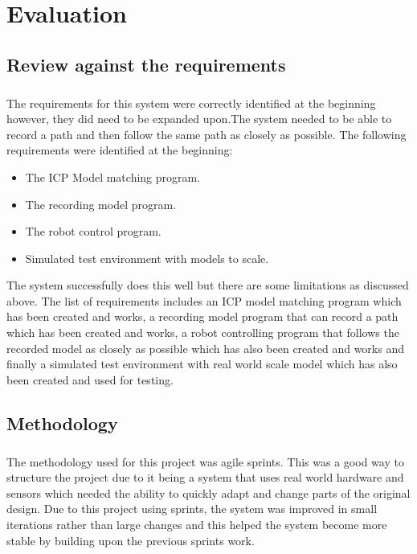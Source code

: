 \chapter{Evaluation}

\section{Review against the requirements}
\paragraph{}
The requirements for this system were correctly identified at the beginning however, they did need to be expanded upon.The system needed to be able to record a path and then follow the same path as closely as possible. The following requirements were identified at the beginning:
\begin{itemize}
  \item The ICP Model matching program.
  \item The recording model program.
  \item The robot control program.
  \item Simulated test environment with models to scale.
\end{itemize}
The system successfully does this well but there are some limitations as discussed above. The list of requirements includes an ICP model matching program which has been created and works, a recording model program that can record a path which has been created and works, a robot controlling program that follows the recorded model as closely as possible which has also been created and works and finally a simulated test environment with real world scale model which has also been created and used for testing.

\section{Methodology}
\paragraph{}
The methodology used for this project was agile sprints. This was a good way to structure the project due to it being a system that uses real world hardware and sensors which needed the ability to quickly adapt and change parts of the original design. Due to this project using sprints, the system was improved in small iterations rather than large changes and this helped the system become more stable by building upon the previous sprints work.

